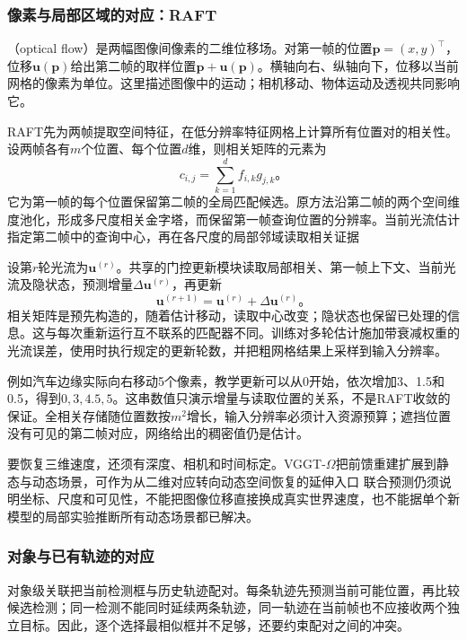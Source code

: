 \subsubsection{像素与局部区域的对应：RAFT}
\label{sec:vision-video-raft}

（optical flow）是两幅图像间像素的二维位移场。对第一帧的位置$\bm{p}=(x,y)^\top$，位移$\bm{u}(\bm{p})$给出第二帧的取样位置$\bm{p}+\bm{u}(\bm{p})$。横轴向右、纵轴向下，位移以当前网格的像素为单位。这里描述图像中的运动；相机移动、物体运动及透视共同影响它。

RAFT先为两帧提取空间特征，在低分辨率特征网格上计算所有位置对的相关性。设两帧各有$m$个位置、每个位置$d$维，则相关矩阵的元素为
\begin{equation}
  c_{i,j}=\sum_{k=1}^{d}f_{i,k}g_{j,k}\text{。}
  \label{eq:vision-video-all-pairs}
\end{equation}
它为第一帧的每个位置保留第二帧的全局匹配候选。原方法沿第二帧的两个空间维度池化，形成多尺度相关金字塔，而保留第一帧查询位置的分辨率。当前光流估计指定第二帧中的查询中心，再在各尺度的局部邻域读取相关证据

设第$r$轮光流为$\bm{u}^{(r)}$。共享的门控更新模块读取局部相关、第一帧上下文、当前光流及隐状态，预测增量$\Delta\bm{u}^{(r)}$，再更新
\[
  \bm{u}^{(r+1)}=\bm{u}^{(r)}+\Delta\bm{u}^{(r)}\text{。}
\]
相关矩阵是预先构造的，随着估计移动，读取中心改变；隐状态也保留已处理的信息。这与每次重新运行互不联系的匹配器不同。训练对多轮估计施加带衰减权重的光流误差，使用时执行规定的更新轮数，并把粗网格结果上采样到输入分辨率。

例如汽车边缘实际向右移动5个像素，教学更新可以从0开始，依次增加3、1.5和0.5，得到$0,3,4.5,5$。这串数值只演示增量与读取位置的关系，不是RAFT收敛的保证。全相关存储随位置数按$m^2$增长，输入分辨率必须计入资源预算；遮挡位置没有可见的第二帧对应，网络给出的稠密值仍是估计。

要恢复三维速度，还须有深度、相机和时间标定。VGGT-$\Omega$把前馈重建扩展到静态与动态场景，可作为从二维对应转向动态空间恢复的延伸入口 联合预测仍须说明坐标、尺度和可见性，不能把图像位移直接换成真实世界速度，也不能据单个新模型的局部实验推断所有动态场景都已解决。

\subsubsection{对象与已有轨迹的对应}
\label{sec:vision-video-association}

对象级关联把当前检测框与历史轨迹配对。每条轨迹先预测当前可能位置，再比较候选检测；同一检测不能同时延续两条轨迹，同一轨迹在当前帧也不应接收两个独立目标。因此，逐个选择最相似框并不足够，还要约束配对之间的冲突。

